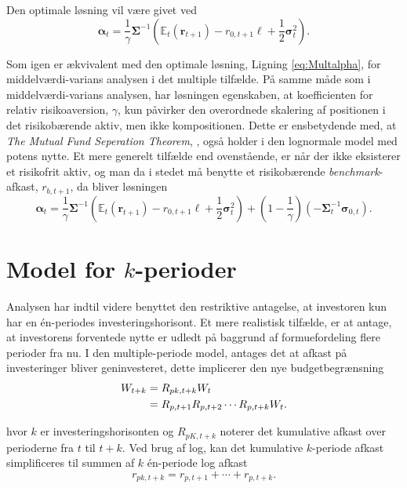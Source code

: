 \documentclass[
  a4paper,
  oneside]{memoir}
\begin{document}
Den optimale løsning vil være givet ved
\begin{equation}
\bm{\alpha}_t=\frac{1}{\gamma}\bm{\Sigma}^{-1}\left(\mathbb{E}_t(\bm{r}_{t+1})-r_{0,t+1}\bm{\ell}+\frac{1}{2}\bm{\sigma}_t^2\right).\label{eq:Potmultalpha}
\end{equation}

Som igen er ækvivalent med den optimale løsning, Ligning \eqref{eq:Multalpha}, for middelværdi-varians analysen i det multiple tilfælde. På samme måde som i middelværdi-varians analysen, har løsningen egenskaben, at koefficienten for relativ risikoaversion, \(\gamma\), kun påvirker den overordnede skalering af positionen i det risikobærende aktiv, men ikke kompositionen. Dette er ensbetydende med, at \textit{The Mutual Fund Seperation Theorem}, \citep{Tobin1958}, også holder i den lognormale model med potens nytte. Et mere generelt tilfælde end ovenstående, er når der ikke eksisterer et risikofrit aktiv, og man da i stedet må benytte et risikobærende \emph{benchmark}-afkast, \(r_{b,t+1}\), da bliver løsningen
\begin{equation}
\bm{\alpha}_t=\frac{1}{\gamma}\bm{\Sigma}^{-1}\left(\mathbb{E}_t(\bm{r}_{t+1})-r_{0,t+1}\bm{\ell}+\frac{1}{2}\bm{\sigma}_t^2\right)+(1-\frac{1}{\gamma})(-\bm{\Sigma}_t^{-1}\bm{\sigma}_{0,t}).
\end{equation}

\hypertarget{model-for-k-perioder}{%
\section{\texorpdfstring{Model for \(k\)-perioder}{Model for k-perioder}}\label{model-for-k-perioder}}

Analysen har indtil videre benyttet den restriktive antagelse, at investoren kun har en én-periodes investeringshorisont. Et mere realistisk tilfælde, er at antage, at investorens forventede nytte er udledt på baggrund af formuefordeling flere perioder fra nu. I den multiple-periode model, antages det at afkast på investeringer bliver geninvesteret, dette implicerer den nye budgetbegrænsning
\begin{align}
W_{t+k}&=R_{pk,t+k}W_t \notag\\
&=R_{p,t+1}R_{p,t+2}\cdots R_{p,t+k}W_t.
\end{align}

hvor \(k\) er investeringshorisonten og \(R_{pK,t+k}\) noterer det kumulative afkast over perioderne fra \(t\) til \(t+k\). Ved brug af log, kan det kumulative \(k\)-periode afkast simplificeres til summen af \(k\) én-periode log afkast
\begin{equation}
r_{pk,t+k}=r_{p,t+1}+\cdots+r_{p,t+k}. \label{eq:sumportk}
\end{equation}
\end{document}
